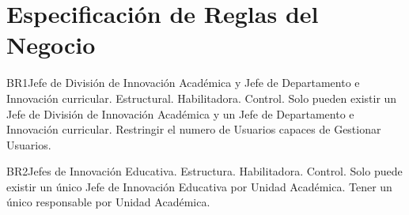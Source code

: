 \chapter{Especificación de Reglas del Negocio}
\begin{BussinesRule}{BR1}{Jefe de División de Innovación Académica y Jefe de Departamento e Innovación curricular.}
    \BRitem[Tipo:] Estructural.
    \BRitem[Clase:] Habilitadora.
    \BRitem[Nivel:] Control.
    \BRitem[Descripción:] Solo pueden existir un Jefe de División de Innovación Académica y un Jefe de Departamento e Innovación curricular.
    \BRitem[Motivación:] Restringir el numero de Usuarios capaces de Gestionar Usuarios.
\end{BussinesRule}

\begin{BussinesRule}{BR2}{Jefes de Innovación Educativa.}
    \BRitem[Tipo:] Estructura.
    \BRitem[Clase:] Habilitadora.
    \BRitem[Nivel:] Control.
    \BRitem[Descripción:] Solo puede existir un único Jefe de Innovación Educativa por Unidad Académica.
    \BRitem[Motivación:] Tener un único responsable por Unidad Académica.
\end{BussinesRule}

